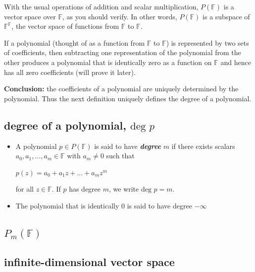 \documentclass{report}
\begin{document}
With the usual operations of addition and scalar multiplication, $P(\mathbb{F})$ is a vector space over $\mathbb{F}$, as you should verify. In other words, $P(\mathbb{F})$ is a subspace of $\mathbb{F}^\mathbb{F}$, the vector space of functions from $\mathbb{F}$ to $\mathbb{F}$.\newline

If a polynomial (thought of as a function from $\mathbb{F}$ to $\mathbb{F}$) is represented by two sets of coefficients, then subtracting one representation of the polynomial from the other produces a polynomial that is identically zero as a function on $\mathbb{F}$ and hence has all zero coefficients (will prove it later).\newline

\textbf{Conclusion: }the coefficients of a polynomial are uniquely determined by the polynomial. Thus the next definition uniquely defines the degree of a polynomial.

\subsection{degree of a polynomial, $\text{deg } p$}
\begin{itemize}
    \item A polynomial $p \in P(\mathbb{F})$ is said to have \textbf{\textit{degree}} $m$ if there exists scalars $a_0, a_1, ..., a_m \in \mathbb{F}$ with $a_m \neq 0$ such that\newline
            \centerline{$p(z)=a_0+a_1z+...+a_mz^m$}\newline\newline
        for all $z \in \mathbb{F}$. If $p$ has degree $m$, we write $\text{deg } p = m$.
    \item The polynomial that is identically $0$ is said to have degree $-\infty$
\end{itemize}

\subsection{$P_m(\mathbb{F})$}

\subsection{infinite-dimensional vector space}
\end{document}
